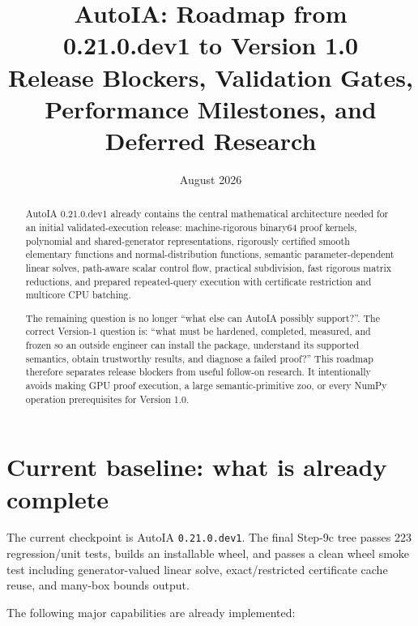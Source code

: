 \documentclass[11pt]{article}
\title{\textbf{AutoIA: Roadmap from 0.21.0.dev1 to Version 1.0}\\
Release Blockers, Validation Gates, Performance Milestones, and Deferred Research}
\author{}
\date{August 2026}
\begin{document}
\maketitle

\begin{abstract}
AutoIA 0.21.0.dev1 already contains the central mathematical architecture needed
for an initial validated-execution release: machine-rigorous binary64 proof
kernels, polynomial and shared-generator representations, rigorously certified
smooth elementary functions and normal-distribution functions, semantic
parameter-dependent linear solves, path-aware scalar control flow, practical
subdivision, fast rigorous matrix reductions, and prepared repeated-query
execution with certificate restriction and multicore CPU batching.

The remaining question is no longer ``what else can AutoIA possibly support?''.
The correct Version-1 question is: ``what must be hardened, completed, measured,
and frozen so an outside engineer can install the package, understand its
supported semantics, obtain trustworthy results, and diagnose a failed proof?''
This roadmap therefore separates release blockers from useful follow-on research.
It intentionally avoids making GPU proof execution, a large semantic-primitive
zoo, or every NumPy operation prerequisites for Version 1.0.
\end{abstract}

\tableofcontents
\newpage

\section{Current baseline: what is already complete}

The current checkpoint is AutoIA \texttt{0.21.0.dev1}.  The final Step-9c tree
passes 223 regression/unit tests, builds an installable wheel, and passes a clean
wheel smoke test including generator-valued linear solve, exact/restricted
certificate cache reuse, and many-box bounds output.

The following major capabilities are already implemented:
\end{document}
